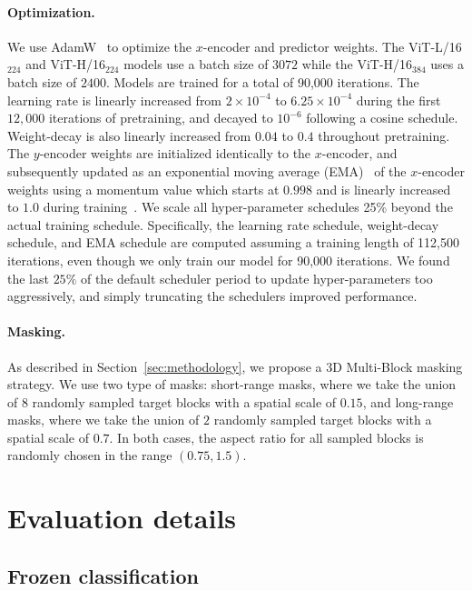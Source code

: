 \documentclass[twocolumn]{fairmeta}
\theoremstyle{plain}
\theoremstyle{definition}
\theoremstyle{remark}
\begin{document}
\paragraph{Optimization.}
We use AdamW~\citep{loshchilov2017decoupled} to optimize the $x$-encoder and predictor weights.
The ViT-L/16$_{224}$ and ViT-H/16$_{224}$ models use a batch size of $3072$ while the ViT-H/16$_{384}$ uses a batch size of $2400$.
Models are trained for a total of 90,000 iterations.
The learning rate is linearly increased from $2\times 10^{-4}$ to $6.25\times 10^{-4}$ during the first $12,000$ iterations of pretraining, and decayed to $10^{-6}$ following a cosine schedule.
Weight-decay is also linearly increased from $0.04$ to $0.4$ throughout pretraining.
The $y$-encoder weights are initialized identically to the $x$-encoder, and subsequently updated as an exponential moving average (EMA)~\citep{tarvainen2017mean} of the $x$-encoder weights using a momentum value which starts at $0.998$ and is linearly increased to $1.0$ during training~\citep{caron2021emerging, assran2022masked}.
We scale all hyper-parameter schedules 25\% beyond the actual training schedule.
Specifically, the learning rate schedule, weight-decay schedule, and EMA schedule are computed assuming a training length of 112,500 iterations, even though we only train our model for 90,000 iterations.
We found the last $25\%$ of the default scheduler period to update hyper-parameters too aggressively, and simply truncating the schedulers improved performance.

\paragraph{Masking.}
As described in Section~\ref{sec:methodology}, we propose a 3D Multi-Block masking strategy. We use two type of masks: short-range masks, where we take the union of $8$ randomly sampled target blocks with a spatial scale of $0.15$, and long-range masks, where we take the union of $2$ randomly sampled target blocks with a spatial scale of $0.7$. In both cases, the aspect ratio for all sampled blocks is randomly chosen in the range $(0.75, 1.5)$.


\section{Evaluation details} \label{app:evaluation}

\subsection{Frozen classification}
\end{document}
